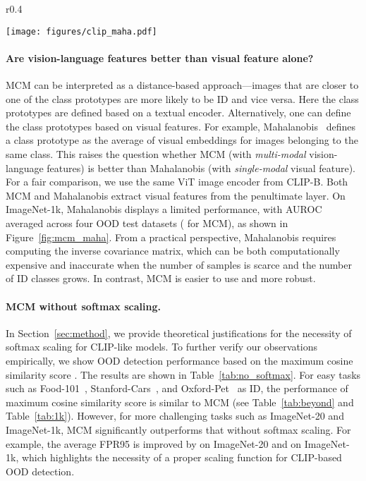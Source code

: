 \documentclass{article}
\begin{document}
\begin{wrapfigure}[15]{r}{0.4\textwidth}
    \vspace{-3mm}
    \begin{center}
    \texttt{[image: figures/clip\_maha.pdf]}
    \end{center}
    \vspace{-2mm}
    \caption{Comparison with Mahalanobis ({Maha}) score on ImageNet-1k.}
    \vspace{-3mm}
    \label{fig:mcm_maha}
\end{wrapfigure}

\paragraph{Are vision-language features better than visual feature alone?}
MCM can be interpreted as a distance-based approach---images that are closer to one of the  class prototypes are more likely to be ID and vice versa. Here the class prototypes are defined based on a textual encoder. Alternatively, one can define the class prototypes based on visual features. For example, Mahalanobis~\cite{lee2018simple} defines a class prototype as the average of visual embeddings for images belonging to the same class. This raises the question whether MCM (with \emph{multi-modal} vision-language features) is better than Mahalanobis (with \emph{single-modal} visual feature). For a fair comparison, we use the same ViT image encoder from CLIP-B. Both MCM and Mahalanobis extract visual features from the penultimate layer. On ImageNet-1k, Mahalanobis displays a limited performance, with  AUROC averaged across four OOD test datasets ( for MCM), as shown in Figure~\ref{fig:mcm_maha}. From a practical perspective, Mahalanobis requires computing the inverse covariance matrix, which can be both computationally expensive and inaccurate when the number of samples is scarce and the number of ID classes grows.
{In contrast, MCM is easier to use and more robust.}

\paragraph{MCM without softmax scaling.}
In Section~\ref{sec:method}, we provide theoretical justifications for the necessity of softmax scaling for CLIP-like models. To further verify our observations empirically, we show OOD detection performance based on the maximum cosine similarity score . The results are shown in Table~\ref{tab:no_softmax}. For easy tasks such as Food-101~\cite{KrauseStarkDengFei-Fei_3DRR2013}, Stanford-Cars~\cite{KrauseStarkDengFei-Fei_3DRR2013}, and Oxford-Pet~\cite{parkhi12a} as ID, the performance of maximum cosine similarity score is similar to MCM (see Table~\ref{tab:beyond} and Table~\ref{tab:1k}). However, for more challenging tasks such as ImageNet-20 and ImageNet-1k, MCM significantly outperforms that without softmax scaling. For example, the average FPR95 is improved by  on ImageNet-20 and  on ImageNet-1k, which highlights the necessity of a proper scaling function for CLIP-based OOD detection.
\end{document}
